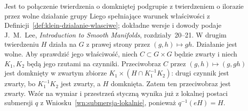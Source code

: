 Jest to połączenie twierdzenia o domkniętej podgrupie z twierdzeniem
o ilorazie przez wolne działanie grupy Liego spełniające warunek
właściwości z Definicji~\ref{def:klein-dzialanie-wlasciwe}; dokładne
wersje i dowody podaje J.\ M.\ Lee, \emph{Introduction to Smooth
Manifolds}, rozdziały~20--21. W drugim twierdzeniu $H$ działa na
$G$ z prawej strony przez $(g,h)\mapsto gh$. Działanie jest wolne.
Aby sprawdzić jego właściwość, niech $C\subset G\times G$ będzie
zwarty i niech $K_1,K_2$ będą jego rzutami na czynniki.
Przeciwobraz $C$ przez $(g,h)\mapsto(g,gh)$ jest domknięty
w zwartym zbiorze
$K_1\times(H\cap K_1^{-1}K_2)$: drugi czynnik jest zwarty,
bo $K_1^{-1}K_2$ jest zwarty, a $H$ domknięta.
Zatem ten przeciwobraz jest zwarty. Wzór na wymiar i przestrzeń
styczną wynika już z lokalnej postaci submersji $q$ z
Wniosku~\ref{wn:submersja-lokalnie}, ponieważ
$q^{-1}(eH)=H$.

